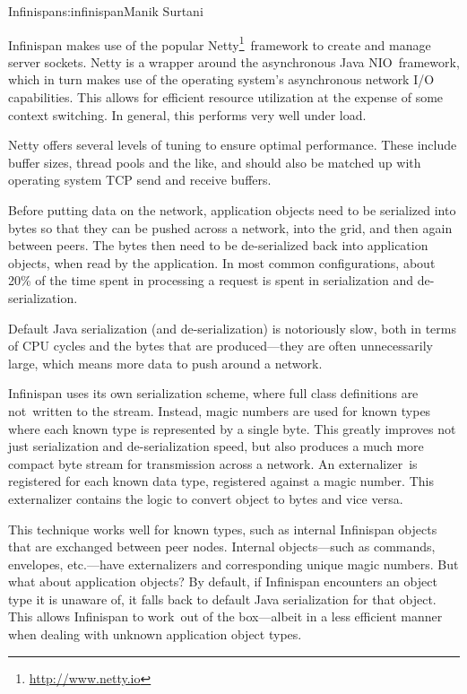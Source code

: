 \begin{aosachapter}{Infinispan}{s:infinispan}{Manik Surtani}

Infinispan makes use of the popular Netty\footnote{\url{http://www.netty.io}}~framework
to create and manage server sockets. Netty is a wrapper around the
asynchronous Java NIO~framework, which in turn makes use of the
operating system's asynchronous network I/O capabilities. This allows
for efficient resource utilization at the expense of some context
switching. In general, this performs very well under load.

Netty offers several levels of tuning to ensure optimal performance.
These include buffer sizes, thread pools and the like, and should also
be matched up with operating system TCP send and receive buffers.


Before putting data on the network, application objects need to be
serialized into bytes so that they can be pushed across a network, into
the grid, and then again between peers. The bytes then need to be
de-serialized back into application objects, when read by the
application. In most common configurations, about 20\% of the time
spent in processing a request is spent in serialization and
de-serialization.

Default Java serialization (and de-serialization) is notoriously slow,
both in terms of CPU cycles and the bytes that are produced---they are
often unnecessarily large, which means more data to push around a
network.

Infinispan uses its own serialization scheme, where full class
definitions are not~written to the stream. Instead, magic numbers are
used for known types where each known type is represented by a single
byte. This greatly improves not just serialization and de-serialization
speed, but also produces a much more compact byte stream for
transmission across a network. An externalizer~is registered for each
known data type, registered against a magic number. This externalizer
contains the logic to convert object to bytes and vice versa.

This technique works well for known types, such as internal Infinispan
objects that are exchanged between peer nodes. Internal objects---such
as commands, envelopes, etc.---have externalizers and corresponding
unique magic numbers. But what about application objects? By default,
if Infinispan encounters an object type it is unaware of, it falls back
to default Java serialization for that object. This allows Infinispan
to work~out of the box---albeit in a less efficient manner when dealing
with unknown application object types.


\end{aosachapter}
